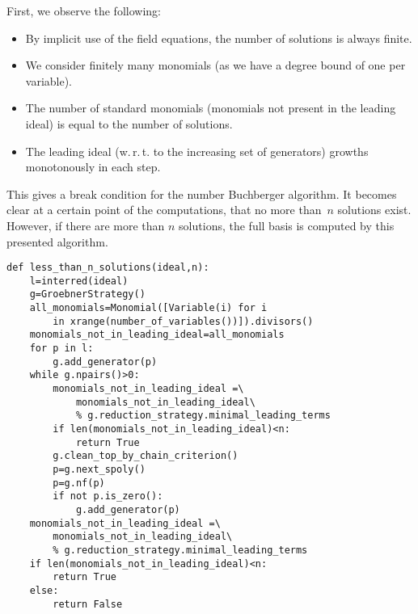 First, we observe the following:
\begin{itemize}
    \item By implicit use of the field equations, the number of solutions is always finite.
    \item We consider finitely many monomials (as we have a degree bound of one per variable).
    \item The number of standard monomials (monomials not present in the leading ideal) is equal to the number of solutions.
    \item The leading ideal (w.\,r.\,t. to the increasing set of generators) growths monotonously in each step.
\end{itemize}
This gives a break condition for the number Buchberger algorithm. It becomes
clear at a certain point of the computations,  that no more than~$n$ solutions exist.
However, if there are more than $n$ solutions, the full \Groebner basis is computed by this presented algorithm.
\begin{lstlisting}
def less_than_n_solutions(ideal,n):
    l=interred(ideal)
    g=GroebnerStrategy()
    all_monomials=Monomial([Variable(i) for i 
        in xrange(number_of_variables())]).divisors()
    monomials_not_in_leading_ideal=all_monomials
    for p in l:
        g.add_generator(p)
    while g.npairs()>0:
        monomials_not_in_leading_ideal =\
            monomials_not_in_leading_ideal\
            % g.reduction_strategy.minimal_leading_terms
        if len(monomials_not_in_leading_ideal)<n:
            return True
        g.clean_top_by_chain_criterion()
        p=g.next_spoly()
        p=g.nf(p)
        if not p.is_zero():
            g.add_generator(p)
    monomials_not_in_leading_ideal =\
        monomials_not_in_leading_ideal\
        % g.reduction_strategy.minimal_leading_terms
    if len(monomials_not_in_leading_ideal)<n:
        return True
    else:
        return False
\end{lstlisting}
